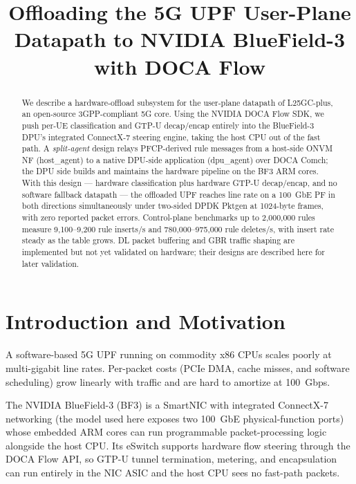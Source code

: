 \documentclass[conference]{IEEEtran}
\title{Offloading the 5G UPF User-Plane Datapath to NVIDIA BlueField-3 with DOCA Flow}
\author{%
  \IEEEauthorblockN{Plabon Dutta}
  \IEEEauthorblockA{Department of Computer Science\\
  University of Kentucky\\
  plabon.dutta@uky.edu}
}
\begin{document}
\maketitle
\thispagestyle{plain}
\pagestyle{plain}


\begin{abstract}
We describe a hardware-offload subsystem for the user-plane datapath
of L25GC-plus, an open-source 3GPP-compliant 5G core.  Using the
NVIDIA DOCA Flow SDK, we push per-UE classification and GTP-U
decap/encap entirely into the BlueField-3 DPU's integrated
ConnectX-7 steering engine, taking the host CPU out of the fast
path.  A \emph{split-agent} design relays PFCP-derived rule messages
from a host-side ONVM NF (host\_agent) to a native DPU-side
application (dpu\_agent) over DOCA Comch; the DPU side builds and
maintains the hardware pipeline on the BF3 ARM cores.  With this
design --- hardware classification plus hardware GTP-U decap/encap,
and no software fallback datapath --- the offloaded UPF reaches line
rate on a 100~GbE PF in both directions simultaneously under
two-sided DPDK Pktgen at 1024-byte frames, with zero reported packet
errors.  Control-plane benchmarks up to 2{,}000{,}000 rules measure
9{,}100--9{,}200 rule inserts/s and 780{,}000--975{,}000 rule
deletes/s, with insert rate steady as the table grows.  DL packet
buffering and GBR traffic shaping are implemented but not yet
validated on hardware; their designs are described here for later
validation.
\end{abstract}

\section{Introduction and Motivation}

A software-based 5G UPF running on commodity x86 CPUs scales poorly at
multi-gigabit line rates.  Per-packet costs (PCIe DMA, cache misses,
and software scheduling) grow linearly with traffic and are hard to
amortize at 100~Gbps.

The NVIDIA BlueField-3 (BF3) is a SmartNIC with integrated
ConnectX-7 networking (the model used here exposes two 100~GbE
physical-function ports) whose embedded ARM cores can run
programmable packet-processing logic alongside the host CPU.  Its
eSwitch supports hardware flow steering through the DOCA Flow API,
so GTP-U tunnel termination, metering, and encapsulation can run
entirely in the NIC ASIC and the host CPU sees no fast-path packets.
\end{document}
